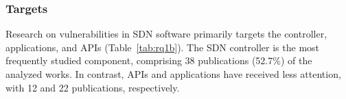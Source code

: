 
\subsubsection{Targets}
Research on vulnerabilities in SDN software primarily targets the controller, applications, and APIs (Table~\ref{tab:rq1b}). The SDN controller is the most frequently studied component, comprising 38 publications (52.7\%) of the analyzed works. In contrast, APIs and applications have received less attention, with 12 and 22 publications, respectively.\\

